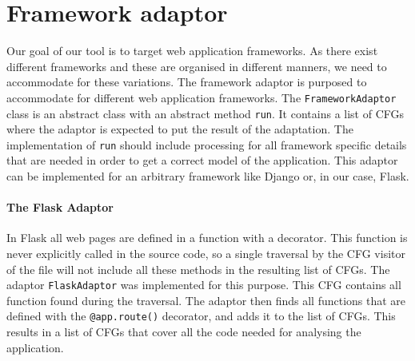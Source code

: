 \section{Framework adaptor}\label{framework_adaptor}
Our goal of our tool is to target web application frameworks.
As there exist different frameworks and these are organised in different manners, we need to accommodate for these variations.
The framework adaptor is purposed to accommodate for different web application frameworks.
The \texttt{FrameworkAdaptor} class is an abstract class with an abstract method \texttt{run}.
It contains a list of CFGs where the adaptor is expected to put the result of the adaptation.
The implementation of \texttt{run} should include processing for all framework specific details that are needed in order to get a correct model of the application.
This adaptor can be implemented for an arbitrary framework like Django or, in our case, Flask.

\paragraph{The Flask Adaptor}
In Flask all web pages are defined in a function with a decorator.
This function is never explicitly called in the source code, so a single traversal by the CFG visitor of the file will not include all these methods in the resulting list of CFGs.
The adaptor \texttt{FlaskAdaptor} was implemented for this purpose.
This CFG contains all function found during the traversal.
The adaptor then finds all functions that are defined with the \texttt{@app.route()} decorator, and adds it to the list of CFGs.
This results in a list of CFGs that cover all the code needed for analysing the application.

